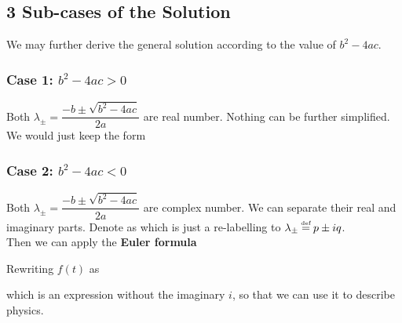 \documentclass[class=article, crop=false, 12pt]{standalone}
\begin{document}
\newpage
\subsection{3 Sub-cases of the Solution}

We may further derive the general solution according to the value of $b^2-4ac$.

\subsubsection{Case 1: $b^2-4ac>0$}

Both $\lambda_\pm = \dfrac{-b\pm\sqrt{b^2-4ac}}{2a}$ are real number. 
Nothing can be further simplified. 
We would just keep the form

\subsubsection{Case 2: $b^2-4ac<0$}

Both $\lambda_\pm = \dfrac{-b\pm\sqrt{b^2-4ac}}{2a}$ are complex number.
We can separate their real and imaginary parts. Denote as
which is just a re-labelling to $\lambda_\pm \defeq p\pm iq$. \\

Then we can apply the \bf{Euler formula}

Rewriting $f(t)$ as 

which is an expression without the imaginary $i$, 
so that we can use it to describe physics. \\
\end{document}
